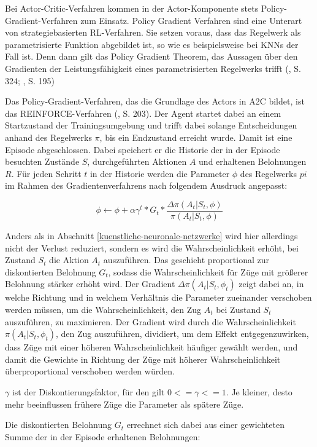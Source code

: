 Bei Actor-Critic-Verfahren kommen in der Actor-Komponente stets Policy-Gradient-Verfahren zum Einsatz. Policy Gradient Verfahren sind eine Unterart von strategiebasierten RL-Verfahren. Sie setzen voraus, dass das Regelwerk als parametrisierte Funktion abgebildet ist, so wie es beispielsweise bei KNNs der Fall ist. Denn dann gilt das Policy Gradient Theorem, das Aussagen über den Gradienten der Leistungsfähigkeit eines parametrisierten Regelwerks trifft (\cite{Sutton.2018}, S. 324; \cite{Albrecht.2024}, S. 195)

Das Policy-Gradient-Verfahren, das die Grundlage des Actors in A2C bildet, ist das REINFORCE-Verfahren (\cite{Albrecht.2024}, S. 203). Der Agent startet dabei an einem Startzustand der Trainingsumgebung und trifft dabei solange Entscheidungen anhand des Regelwerks $\pi$, bis ein Endzustand erreicht wurde. Damit ist eine Episode abgeschlossen. Dabei speichert er die Historie der in der Episode besuchten Zustände $S$, durchgeführten Aktionen $A$ und erhaltenen Belohnungen $R$. Für jeden Schritt $t$ in der Historie werden die Parameter $\phi$ des Regelwerks $pi$ im Rahmen des Gradientenverfahrens nach folgendem Ausdruck angepasst:

\[ \phi \leftarrow \phi {+} \alpha \gamma ^{t} * G_t * \frac{\Delta \pi (A_t|S_t, \phi)}{\pi (A_t|S_t, \phi)} \]

Anders als in Abschnitt \ref{kuenstliche-neuronale-netzwerke} wird hier allerdings nicht der Verlust reduziert, sondern es wird die Wahrscheinlichkeit erhöht, bei Zustand $S_t$ die Aktion $A_t$ auszuführen. Das geschieht proportional zur diskontierten Belohnung $G_t$, sodass die Wahrscheinlichkeit für Züge mit größerer Belohnung stärker erhöht wird. Der Gradient $\Delta \pi (A_t|S_t, \phi_t)$ zeigt dabei an, in welche Richtung und in welchem Verhältnis die Parameter zueinander verschoben werden müssen, um die Wahrscheinlichkeit, den Zug $A_t$ bei Zustand $S_t$ auszuführen, zu maximieren. Der Gradient wird durch die Wahrscheinlichkeit $\pi (A_t|S_t, \phi_t)$, den Zug auszuführen, dividiert, um dem Effekt entgegenzuwirken, dass Züge mit einer höheren Wahrscheinlichkeit häufiger gewählt werden, und damit die Gewichte in Richtung der Züge mit höherer Wahrscheinlichkeit überproportional verschoben werden würden.

$\gamma$ ist der Diskontierungsfaktor, für den gilt $0 <= \gamma <= 1$. Je kleiner, desto mehr beeinflussen frühere Züge die Parameter als spätere Züge.

Die diskontierten Belohnung $G_t$ errechnet sich dabei aus einer gewichteten Summe der in der Episode erhaltenen Belohnungen:

